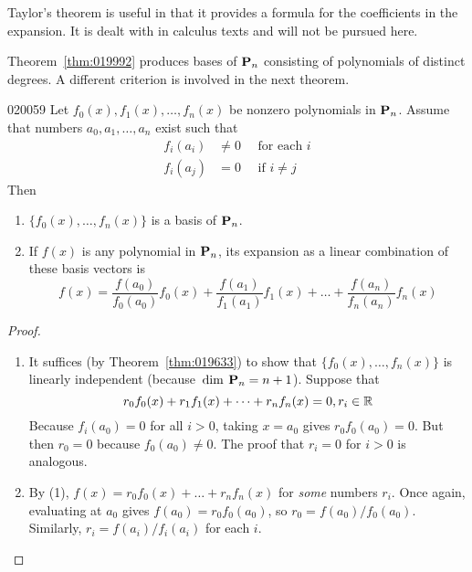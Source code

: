 Taylor's theorem is useful in that it provides a formula for the coefficients in the expansion. It is dealt with in calculus texts and will not be pursued here.

Theorem~\ref{thm:019992} produces bases of $\textbf{P}_{n}$ consisting of polynomials of distinct degrees. A different criterion is involved in the next theorem.

\begin{theorem}{}{020059}
Let $f_{0}(x), f_{1}(x), \dots, f_{n}(x)$ be nonzero polynomials in $\textbf{P}_{n}$. Assume that numbers $a_{0}, a_{1}, \dots, a_{n}$ exist such that
\vspace*{-0.5em}
\begin{align*}
 f_i(a_i) &\neq 0 \quad \mbox{ for each } i \\
 f_i(a_j) &= 0 \quad \mbox{ if } i \neq j
\end{align*}
Then

\begin{enumerate}
\item $\{f_{0}(x), \dots, f_{n}(x)\}$ is a basis of $\textbf{P}_{n}$.

\item If $f(x)$ is any polynomial in $\textbf{P}_{n}$, its expansion as a linear combination of these basis vectors is
\begin{equation*}
f(x) = \frac{f(a_0)}{f_0(a_0)} f_0(x) + \frac{f(a_1)}{f_1(a_1)} f_1(x) + \dots + \frac{f(a_n)}{f_n(a_n)} f_n(x)
\end{equation*}
\vspace*{0.05em}
\end{enumerate}
\end{theorem}

\begin{proof}
\begin{enumerate}
\item It suffices (by Theorem~\ref{thm:019633}) to show that $\{f_{0}(x), \dots, f_{n}(x)\}$ is linearly independent (because $\thinspace\operatorname{dim\medspace} \textbf{P}_{n} = n + 1$). Suppose that
\begin{equation*}
r_0f_0(x) + r_1f_1(x) + \dots + r_nf_n(x) = 0, r_i \in \mathbb{R}
\end{equation*}
Because $f_{i}(a_{0}) = 0$ for all $i > 0$, taking $x = a_{0}$ gives $r_{0}f_{0}(a_{0}) = 0$. But then $r_{0} = 0$ because $f_{0}(a_{0}) \neq 0$. The proof that $r_{i} = 0$ for $i > 0$ is analogous.

\item By (1), $f(x) = r_{0}f_{0}(x) + \dots + r_{n}f_{n}(x)$ for \textit{some} numbers $r_{i}$. Once again, evaluating at $a_{0}$ gives $f(a_{0}) = r_{0}f_{0}(a_{0})$, so $r_{0} = f(a_{0}) / f_{0}(a_{0})$. Similarly, $r_{i} = f(a_{i}) / f_{i}(a_{i})$ for each $i$.
\end{enumerate}
\vspace*{-2em}\end{proof}


